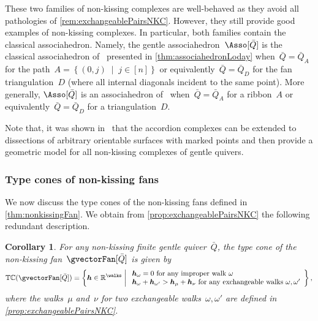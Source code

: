 \documentclass{amsart}
\newtheorem{corollary}[theorem]{Corollary}
\theoremstyle{definition}
\newcommand{\R}{\mathbb{R}} %
\renewcommand{\b}[1]{{\boldsymbol{#1}}} %
\newcommand{\set}[2]{\left\{ #1 \;\middle|\; #2 \right\}} %
\newcommand{\typeCone}{\mathbb{TC}} %
\newcommand{\quiver}{\bar Q} %
\begin{document}
These two families of non-kissing complexes are well-behaved as they avoid all pathologies of \cref{rem:exchangeablePairsNKC}.
However, they still provide good examples of non-kissing complexes.
In particular, both families contain the classical associahedron.
Namely, the gentle associahedron~$\Asso[\quiver]$ is the classical associahedron of~\cite{ShniderSternberg, Loday} presented in \cref{thm:associahedronLoday} when~${\quiver = \quiver_A}$ for the path~${A = \set{(0,j)}{j \in [n]}}$ or equivalently~$\quiver = \quiver_D$ for the fan triangulation~$D$ (where all internal diagonals incident to the same point).
More generally, $\Asso[\quiver]$ is an associahedron of~\cite{HohlwegLange} when~$\quiver = \quiver_A$ for a ribbon~$A$ or equivalently~$\quiver = \quiver_D$ for a triangulation~$D$.

Note that, it was shown in~\cite{PaluPilaudPlamondon-surfaces} that the accordion complexes can be extended to dissections of arbitrary orientable surfaces with marked points and then provide a geometric model for all non-kissing complexes of gentle quivers.

\subsubsection{Type cones of non-kissing fans}

We now discuss the type cones of the non-kissing fans defined in \cref{thm:nonkissingFan}. We obtain from \cref{prop:exchangeablePairsNKC} the following redundant description.

\begin{corollary}
For any non-kissing finite gentle quiver~$\quiver$, the type cone of the non-kissing fan~$\gvectorFan[\quiver]$ is given by
\[
\typeCone(\gvectorFan[\quiver]) = \set{\b{h} \in \R^{\walks}}{\begin{array}{l} \b{h}_\omega = 0 \text{ for any improper walk } \omega \\ \b{h}_\omega + \b{h}_{\omega'} > \b{h}_\mu + \b{h}_\nu \text{ for any exchangeable walks } \omega, \omega' \end{array}},
\]
where the walks~$\mu$ and~$\nu$ for two exchangeable walks~$\omega, \omega'$ are defined in \cref{prop:exchangeablePairsNKC}.
\end{corollary}
\end{document}

